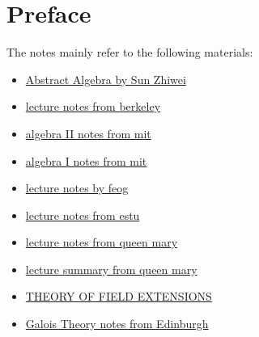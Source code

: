 \chapter*{Preface}

The notes mainly refer to the following materials:
\begin{itemize}
    \item \href{https://www.bilibili.com/video/BV1AL4y1h7iF?p=1&vd_source=3d4b12fb4a4bfbc98942d43612ae2fb9}{Abstract Algebra by Sun Zhiwei}
    \item \href{https://math.berkeley.edu/~mcivor/math113su16/}{lecture notes from berkeley}
    \item \href{https://ocw.mit.edu/courses/res-18-012-algebra-ii-student-notes-spring-2022/pages/student-notes/}{algebra II notes from mit}
    \item \href{https://ocw.mit.edu/courses/res-18-011-algebra-i-student-notes-fall-2021/pages/student-notes/}{algebra I notes from mit}
    \item \href{https://feog.github.io/}{lecture notes by feog}
    \item \href{https://faculty.etsu.edu/gardnerr/5410/notes/III-1.pdf}{lecture notes from estu}
    \item \href{https://webspace.maths.qmul.ac.uk/p.j.cameron/notes/algstr.pdf}{lecture notes from queen mary}
    \item \href{https://webspace.maths.qmul.ac.uk/r.a.wilson/MTH5100/notes1.pdf}{lecture summary from queen mary}
    \item \href{https://mdu.ac.in/UpFiles/UpPdfFiles/2021/Jun/4_06-28-2021_11-45-05_Theory%20of%20Field%20Extensions_(20MAT22C1).pdf}{THEORY OF FIELD EXTENSIONS}
    \item \href{https://www.maths.ed.ac.uk/%7Etl/gt/gt.pdf}{Galois Theory notes from Edinburgh}
\end{itemize}

